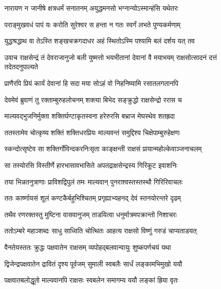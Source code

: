 \twolineshloka
{नारायण न जानीषे क्षत्रधर्मं सनातनम्}
{अयुद्धमनसो भग्नान्योऽस्मान्हंसि यथेतरः} %

\twolineshloka
{पराङ्मुखवधं पापं यः करोति सुरेश्वर}
{स हन्ता न गतः स्वर्गं लभते पुण्यकर्मणाम्} %

\twolineshloka
{युद्धश्रद्धाथ वा तेऽस्ति शङ्खचक्रगदाधर}
{अहं स्थितोऽस्मि पश्यामि बलं दर्शय यत् तव} %

\threelineshloka
{उवाच राक्षसेन्द्रं तं देवराजानुजो बली}
{युष्मत्तो भयभीतानां देवानां वै मयाभयम्}
{राक्षसोत्सादनं दत्तं तदेतदनुपाल्यते} %

\twolineshloka
{प्राणैरपि प्रियं कार्यं देवानां हि सदा मया}
{सोऽहं वो निहनिष्यामि रसातलगतानपि} %

\twolineshloka
{देवमेवं ब्रुवाणं तु रक्ताम्बुरुहलोचनम्}
{शक्त्या बिभेद सङ्क्रुद्धो राक्षसेन्द्रो ररास च} %

\twolineshloka
{माल्यवद्भुजनिर्मुक्ता शक्तिर्घण्टाकृतस्वना}
{हरेरुरसि बभ्राज मेघस्थेव शतह्रदा} %

\twolineshloka
{ततस्तामेव चोत्कृष्य शक्तिं शक्तिधरप्रियः}
{माल्यवन्तं समुद्दिश्य चिक्षेपाम्बुरुहेक्षणः} %

\twolineshloka
{स्कन्दोत्सृष्टेव सा शक्तिर्गोविन्दकरनिःसृता}
{काङ्क्षन्ती राक्षसं प्रायान्महोल्केवाञ्जनाचलम्} %

\twolineshloka
{सा तस्योरसि विस्तीर्णे हारभासावभासिते}
{अपतद्राक्षसेन्द्रस्य गिरिकूट इवाशनिः} %

\twolineshloka
{तया भिन्नतनुत्राणाः प्राविशद्विपुलं तमः}
{माल्यवान् पुनराश्वस्तस्तस्थौ गिरिरिवाचलः} %

\twolineshloka
{ततः कार्ष्णायसं शूलं कण्टकैर्बहुभिश्चितम्}
{प्रगृह्याभ्यहनद् देवं स्तनयोरन्तरे दृढम्} %

\twolineshloka
{तथैव रणरक्तस्तु मुष्टिना वासवानुजम्}
{ताडयित्वा धनुर्मात्रमपक्रान्तो निशाचरः} %

\twolineshloka
{ततोऽम्बरे महाञ्शब्दः साधु साध्विति चोत्थितः}
{आहत्य राक्षसो विष्णुं गरुडं चाप्यताडयत्} %

\twolineshloka
{वैनतेयस्ततः क्रुद्धः पक्षवातेन राक्षसम्}
{व्यपोहद्बलवान्वायुः शुष्कपर्णचयं यथा} %

\twolineshloka
{द्विजेन्द्रपक्षवातेन द्रावितं दृश्य पूर्वजम्}
{सुमाली स्वबलैः सार्धं लङ्कामभिमुखो ययौ} %

\twolineshloka
{पक्षवातबलोद्धूतो माल्यवानपि राक्षसः}
{स्वबलेन समागम्य ययौ लङ्कां ह्रिया वृतः} %

